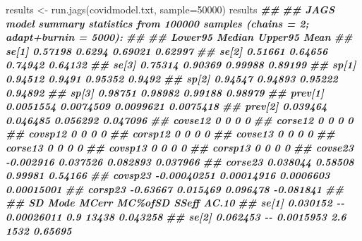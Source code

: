 \documentclass[
  ignorenonframetext,
  aspectratio=169,
]{beamer}
\newenvironment{Shaded}{\begin{snugshade}}{\end{snugshade}}
\newcommand{\AttributeTok}[1]{\textcolor[rgb]{0.77,0.63,0.00}{#1}}
\newcommand{\DecValTok}[1]{\textcolor[rgb]{0.00,0.00,0.81}{#1}}
\newcommand{\DocumentationTok}[1]{\textcolor[rgb]{0.56,0.35,0.01}{\textbf{\textit{#1}}}}
\newcommand{\FunctionTok}[1]{\textcolor[rgb]{0.00,0.00,0.00}{#1}}
\newcommand{\NormalTok}[1]{#1}
\newcommand{\OtherTok}[1]{\textcolor[rgb]{0.56,0.35,0.01}{#1}}
\newcommand{\StringTok}[1]{\textcolor[rgb]{0.31,0.60,0.02}{#1}}
\begin{document}
\begin{frame}[fragile]
\scriptsize

\begin{Shaded}
\begin{Highlighting}[]
\NormalTok{results }\OtherTok{\textless{}{-}} \FunctionTok{run.jags}\NormalTok{(}\StringTok{\textquotesingle{}covidmodel.txt\textquotesingle{}}\NormalTok{, }\AttributeTok{sample=}\DecValTok{50000}\NormalTok{)}
\NormalTok{results}
\DocumentationTok{\#\# }
\DocumentationTok{\#\# JAGS model summary statistics from 100000 samples (chains = 2; adapt+burnin = 5000):}
\DocumentationTok{\#\#                                                    }
\DocumentationTok{\#\#             Lower95     Median   Upper95       Mean}
\DocumentationTok{\#\# se[1]       0.57198     0.6294   0.69021    0.62997}
\DocumentationTok{\#\# se[2]       0.51661    0.64656   0.74942    0.64132}
\DocumentationTok{\#\# se[3]       0.75314    0.90369   0.99988    0.89199}
\DocumentationTok{\#\# sp[1]       0.94512     0.9491   0.95352     0.9492}
\DocumentationTok{\#\# sp[2]       0.94547    0.94893   0.95222    0.94892}
\DocumentationTok{\#\# sp[3]       0.98751    0.98982   0.99188    0.98979}
\DocumentationTok{\#\# prev[1]   0.0051554  0.0074509 0.0099621  0.0075418}
\DocumentationTok{\#\# prev[2]    0.039464   0.046485  0.056292   0.047096}
\DocumentationTok{\#\# covse12           0          0         0          0}
\DocumentationTok{\#\# corse12           0          0         0          0}
\DocumentationTok{\#\# covsp12           0          0         0          0}
\DocumentationTok{\#\# corsp12           0          0         0          0}
\DocumentationTok{\#\# covse13           0          0         0          0}
\DocumentationTok{\#\# corse13           0          0         0          0}
\DocumentationTok{\#\# covsp13           0          0         0          0}
\DocumentationTok{\#\# corsp13           0          0         0          0}
\DocumentationTok{\#\# covse23   {-}0.002916   0.037526  0.082893   0.037966}
\DocumentationTok{\#\# corse23    0.038044    0.58508   0.99981    0.54166}
\DocumentationTok{\#\# covsp23 {-}0.00040251 0.00014916 0.0006603 0.00015001}
\DocumentationTok{\#\# corsp23    {-}0.63667   0.015469  0.096478  {-}0.081841}
\DocumentationTok{\#\#                                                            }
\DocumentationTok{\#\#                 SD Mode       MCerr MC\%ofSD SSeff     AC.10}
\DocumentationTok{\#\# se[1]     0.030152   {-}{-}  0.00026011     0.9 13438  0.043258}
\DocumentationTok{\#\# se[2]     0.062453   {-}{-}   0.0015953     2.6  1532   0.65695}

\end{Highlighting}
\end{Shaded}
\end{frame}
\end{document}
